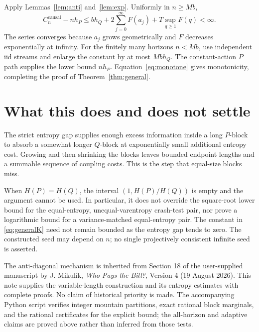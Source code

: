 \documentclass[11pt,a4paper]{article}
\newcommand{\cc}{C^{\mathrm{causal}}}
\begin{document}
Apply Lemmas~\ref{lem:anti} and~\ref{lem:exp}. Uniformly in $n\ge Mb$,
\begin{equation}\label{eq:generalK}
\cc_n-nh_P\le
bh_Q+2\sum_{j=0}^\infty F(a_j)+T\sup_{q\ge1}F(q)<\infty.
\end{equation}
The series converges because $a_j$ grows geometrically and $F$ decreases
exponentially at infinity. For the finitely many horizons $n<Mb$, use
independent iid streams and enlarge the constant by at most $Mb h_Q$.
The constant-action $P$ path supplies the lower bound $nh_P$.
Equation~\eqref{eq:monotone} gives monotonicity, completing the proof of
Theorem~\ref{thm:general}.

\section{What this does and does not settle}
The strict entropy gap supplies enough excess information inside a long
$P$-block to absorb a somewhat longer $Q$-block at exponentially small
additional entropy cost. Growing and then shrinking the blocks leaves
bounded endpoint lengths and a summable sequence of coupling costs.
This is the step that equal-size blocks miss.

When $H(P)=H(Q)$, the interval $(1,H(P)/H(Q))$ is empty and the argument
cannot be used. In particular, it does not override the square-root
lower bound for the equal-entropy, unequal-varentropy crash-test pair,
nor prove a logarithmic bound for a variance-matched equal-entropy pair.
The constant in \eqref{eq:generalK} need not remain bounded as the entropy
gap tends to zero. The constructed seed may depend on $n$; no single
projectively consistent infinite seed is asserted.

The anti-diagonal mechanism is inherited from Section 18 of the
user-supplied manuscript by J. Mikul\'ik, \emph{Who Pays the Bill?},
Version 4 (19 August 2026). This note supplies the variable-length
construction and its entropy estimates with complete proofs. No claim
of historical priority is made. The accompanying Python script verifies
integer mountain partitions, exact rational block marginals, and the
rational certificates for the explicit bound; the all-horizon and adaptive
claims are proved above rather than inferred from those tests.
\end{document}
